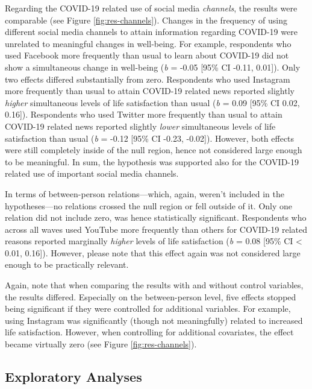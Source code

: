 \documentclass[
  english,
  man,mask,floatsintext]{apa6}
\begin{document}
Regarding the COVID-19 related use of social media \emph{channels}, the results were comparable (see Figure \ref{fig:res-channels}).
Changes in the frequency of using different social media channels to attain information regarding COVID-19 were unrelated to meaningful changes in well-being.
For example, respondents who used Facebook more frequently than usual to learn about COVID-19 did not show a simultaneous change in well-being (\emph{b} = -0.05 {[}95\% CI -0.11, 0.01{]}).
Only two effects differed substantially from zero.
Respondents who used Instagram more frequently than usual to attain COVID-19 related news reported slightly \emph{higher} simultaneous levels of life satisfaction than usual (\emph{b} = 0.09 {[}95\% CI 0.02, 0.16{]}).
Respondents who used Twitter more frequently than usual to attain COVID-19 related news reported slightly \emph{lower} simultaneous levels of life satisfaction than usual (\emph{b} = -0.12 {[}95\% CI -0.23, -0.02{]}).
However, both effects were still completely inside of the null region, hence not considered large enough to be meaningful.
In sum, the hypothesis was supported also for the COVID-19 related use of important social media channels.

In terms of between-person relations---which, again, weren't included in the hypotheses---no relations crossed the null region or fell outside of it.
Only one relation did not include zero, was hence statistically significant.
Respondents who across all waves used YouTube more frequently than others for COVID-19 related reasons reported marginally \emph{higher} levels of life satisfaction (\emph{b} = 0.08 {[}95\% CI \textless{} 0.01, 0.16{]}).
However, please note that this effect again was not considered large enough to be practically relevant.

Again, note that when comparing the results with and without control variables, the results differed.
Especially on the between-person level, five effects stopped being significant if they were controlled for additional variables.
For example, using Instagram was significantly (though not meaningfully) related to increased life satisfaction.
However, when controlling for additional covariates, the effect became virtually zero (see Figure \ref{fig:res-channels}).

\hypertarget{exploratory-analyses}{%
\subsection{Exploratory Analyses}\label{exploratory-analyses}}
\end{document}
